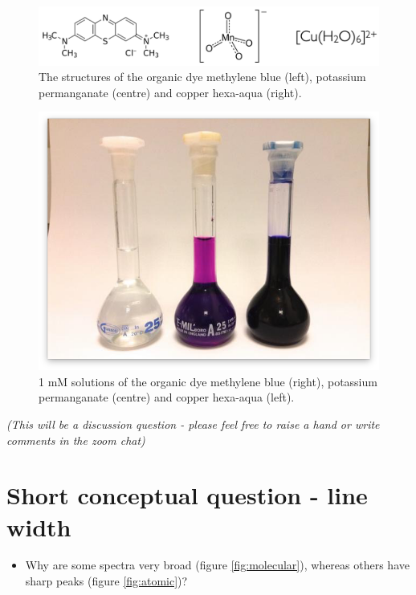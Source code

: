 \documentclass[
]{book}
\providecommand{\tightlist}{%
  \setlength{\itemsep}{0pt}\setlength{\parskip}{0pt}}
\begin{document}
\begin{figure}

{\centering \includegraphics[width=0.7\linewidth]{images/molarextquestion} 

}

\caption{The structures of the organic dye methylene blue (left), potassium permanganate (centre) and copper hexa-aqua (right).}\label{fig:molarextstructures}
\end{figure}

\begin{figure}

{\centering \includegraphics[width=0.7\linewidth]{images/Molar_extinction_coefficients} 

}

\caption{1 mM solutions of the organic dye methylene blue (right), potassium permanganate (centre) and copper hexa-aqua (left).}\label{fig:molarextsolutions}
\end{figure}

\emph{(This will be a discussion question - please feel free to raise a hand or write comments in the zoom chat)}

\hypertarget{sec:linewidth}{%
\section{Short conceptual question - line width}\label{sec:linewidth}}

\begin{itemize}
\tightlist
\item
  Why are some spectra very broad (figure \ref{fig:molecular}), whereas others have sharp peaks (figure \ref{fig:atomic})?
\end{itemize}
\end{document}
